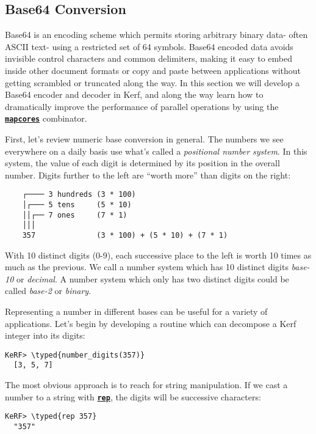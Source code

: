 \documentclass{article}
\newcommand{\typed}[1]{\textcolor{TealBlue}{#1}}
\newcommand{\primu}[2]{\hyperref[prim:#2]{\textbf{\texttt{#1}}}}
\newcommand{\prim}[1]{\primu{#1}{#1}}
\newcommand{\comb}[1]{\primu{#1}{#1}}
\begin{document}
\pagebreak
\subsection{Base64 Conversion}
Base64 is an encoding scheme which permits storing arbitrary binary data- often ASCII text- using a restricted set of 64 symbols. Base64 encoded data avoids invisible control characters and common delimiters, making it easy to embed inside other document formats or copy and paste between applications without getting scrambled or truncated along the way. In this section we will develop a Base64 encoder and decoder in Kerf, and along the way learn how to dramatically improve the performance of parallel operations by using the \comb{mapcores} combinator.

\vspace{0.5cm}

First, let's review numeric base conversion in general. The numbers we see everywhere on a daily basis use what's called a \emph{positional number system}. In this system, the value of each digit is determined by its position in the overall number. Digits further to the left are ``worth more'' than digits on the right:

\begin{Verbatim}
	┌──── 3 hundreds (3 * 100)
	│┌─── 5 tens     (5 * 10)
	││┌── 7 ones     (7 * 1)
	│││
	357              (3 * 100) + (5 * 10) + (7 * 1)
\end{Verbatim}

With 10 distinct digits (0-9), each successive place to the left is worth 10 times as much as the previous. We call a number system which has 10 distinct digits \emph{base-10} or \emph{decimal}. A number system which only has two distinct digits could be called \emph{base-2} or \emph{binary}. 

\vspace{0.5cm}

Representing a number in different bases can be useful for a variety of applications. Let's begin by developing a routine which can decompose a Kerf integer into its digits:
\begin{Verbatim}
KeRF> \typed{number_digits(357)}
  [3, 5, 7]
\end{Verbatim}

The most obvious approach is to reach for string manipulation. If we cast a number to a string with \prim{rep}, the digits will be successive characters:
\begin{Verbatim}
KeRF> \typed{rep 357}
  "357"
\end{Verbatim}
\end{document}
